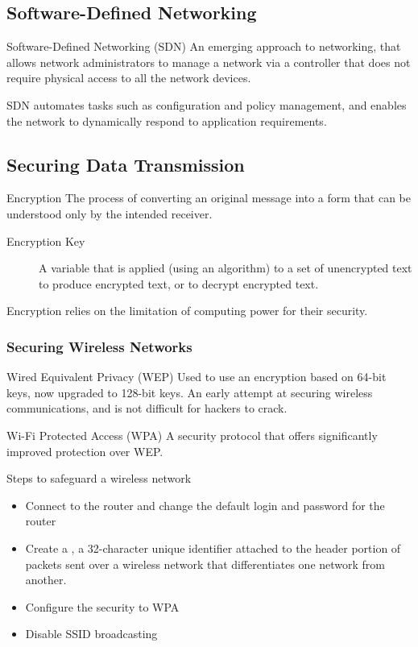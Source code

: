 \documentclass[\main/notes.tex]{subfiles}
\begin{document}
			\subsection{Software-Defined Networking}
				\begin{definition}{Software-Defined Networking (SDN)}
					An emerging approach to networking, that allows network administrators to manage a network via a controller that does not require physical access to all the network devices.

					SDN automates tasks such as configuration and policy management, and enables the network to dynamically respond to application requirements.
				\end{definition}
			\subsection{Securing Data Transmission}
				\begin{definition}{Encryption}
					The process of converting an original message into a form that can be understood only by the intended receiver.
					\begin{description}
						\item[Encryption Key] A variable that is applied (using an algorithm) to a set of unencrypted text to produce encrypted text, or to decrypt encrypted text. 
					\end{description}
					Encryption relies on the limitation of computing power for their security.
				\end{definition}
				\subsubsection{Securing Wireless Networks}
					\begin{definition}{Wired Equivalent Privacy (WEP)}
						Used to use an encryption based on 64-bit keys, now upgraded to 128-bit keys. An early attempt at securing wireless communications, and is not difficult for hackers to crack.
					\end{definition}
					\begin{definition}{Wi-Fi Protected Access (WPA)}
						A security protocol that offers significantly improved protection over WEP.
					\end{definition}
					\begin{sidenote}{Steps to safeguard a wireless network}
						\begin{itemize}
							\item Connect to the router and change the default login and password for the router
							\item Create a , a 32-character unique identifier attached to the header portion of packets sent over a wireless network that differentiates one network from another.
							\item Configure the security to WPA
							\item Disable SSID broadcasting
						\end{itemize}
					\end{sidenote}
\end{document}
